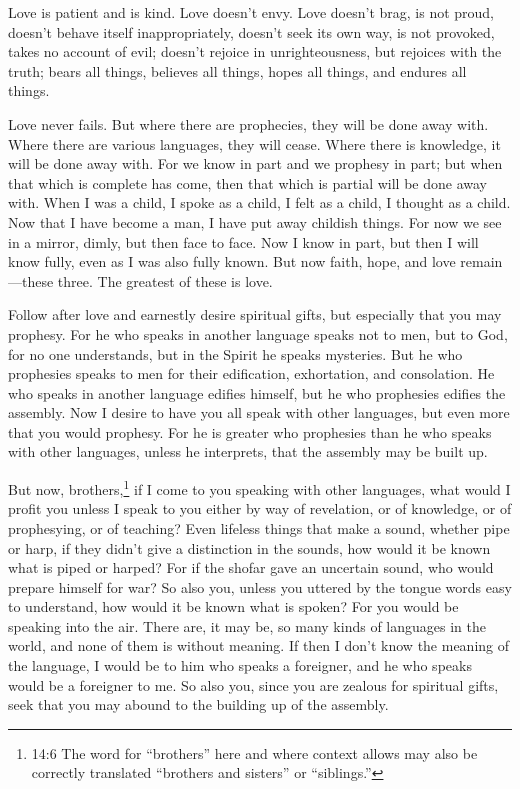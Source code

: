 \myverse{}Love is patient and is kind. Love doesn’t envy. Love doesn’t brag,
is not proud,
\myverse{}doesn’t behave itself inappropriately, doesn’t seek its own way, is not provoked,
takes no account of evil;
\myverse{}doesn’t rejoice in unrighteousness, but rejoices with the truth;
\myverse{}bears all things, believes all things, hopes all things, and endures all things.

\myverse{}Love never fails. But where there are prophecies, they will be
done away with. Where there are various languages, they will cease. Where there is knowledge, it will
be done away with.
\myverse{}For we know in part and we prophesy in part;
\myverse{}but when that which is complete has come, then that which is partial will
be done away with.
\myverse{}When I was a child, I spoke as a child, I felt as a child, I thought as a
child. Now that I have become a man, I have put away childish things.
\myverse{}For now we see in a mirror, dimly, but then face to face. Now I know in part,
but then I will know fully, even as I was also fully known.
\myverse{}But now faith, hope, and love remain—these three. The greatest of these is
love.



\mychapter{} \myverse*{}Follow after love and earnestly desire spiritual gifts, but especially
that you may prophesy.
\myverse{}For he who speaks in another language speaks not to men, but to God, for no
one understands, but in the Spirit he speaks mysteries.
\myverse{}But he who prophesies speaks to men for their edification, exhortation, and
consolation.
\myverse{}He who speaks in another language edifies himself, but he who prophesies edifies
the assembly.
\myverse{}Now I desire to have you all speak with other languages, but even more that
you would prophesy. For he is greater who prophesies than he who speaks with other languages, unless he
interprets, that the assembly may be built up.

\myverse{}But now, brothers,\footnote{14:6 The word for “brothers” here and where context allows may also be correctly translated “brothers
	and sisters” or “siblings.”
} if I come to you speaking with other languages, what would I profit you unless I speak to you
either by way of revelation, or of knowledge, or of prophesying, or of teaching?
\myverse{}Even lifeless things that make a sound, whether pipe or harp, if they didn’t
give a distinction in the sounds, how would it be known what is piped or harped?
\myverse{}For if the shofar gave an uncertain sound, who would prepare himself for war?
\myverse{}So also you, unless you uttered by the tongue words easy to understand, how
would it be known what is spoken? For you would be speaking into the air.
\myverse{}There are, it may be, so many kinds of languages in the world, and none of
them is without meaning.
\myverse{}If then I don’t know the meaning of the language, I would be to him who speaks
a foreigner, and he who speaks would be a foreigner to me.
\myverse{}So also you, since you are zealous for spiritual gifts, seek that you may
abound to the building up of the assembly.

